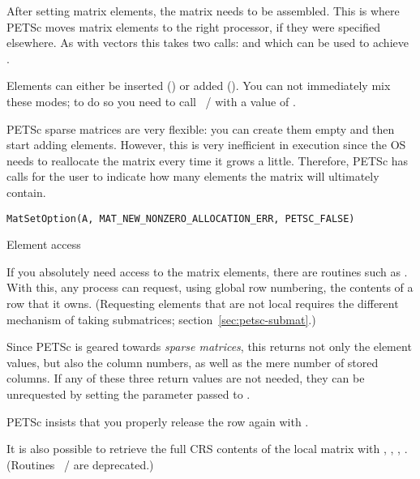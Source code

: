 After setting matrix elements, the matrix needs to be assembled. This
is where PETSc moves matrix elements to the right processor, if they
were specified elsewhere. As with vectors this takes two calls:
%
and
%
which can be used to achieve .

Elements can either be inserted
() or added
().
You can not immediately mix these modes; to do so you need to call
~/ 
with a value of .

PETSc sparse matrices are very flexible: you can create them empty and
then start adding elements. However, this is very inefficient in
execution since the \ac{OS} needs to reallocate the matrix every time
it grows a little. Therefore, PETSc has calls for the user to indicate
how many elements the matrix will ultimately contain.
%

\begin{lstlisting}
MatSetOption(A, MAT_NEW_NONZERO_ALLOCATION_ERR, PETSC_FALSE)
\end{lstlisting}

 {Element access}

If you absolutely need access to the matrix elements, there are
routines such as 
.
With this, any process can request, using global row numbering,
the contents of a row that it owns.
(Requesting elements that are not local requires the
different mechanism of taking submatrices; section~\ref{sec:petsc-submat}.)

Since PETSc is geared towards
\emph{sparse matrices},
this returns not only the element values, but also the column numbers,
as well as the mere number of stored columns.
If any of these three return values are not needed, they can be
unrequested by setting the parameter passed to .

PETSc insists that you properly release the row again with
.

It is also possible to retrieve the full \ac{CRS} contents
of the local matrix with
,
,
,
.
(Routines ~/ 
are deprecated.)

